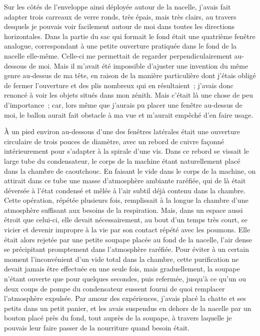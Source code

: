 \documentclass[french,twoside]{book} %
\begin{document}
Sur les côtés de l’enveloppe ainsi déployée autour de la nacelle, j’avais fait adapter trois carreaux de verre ronds, très épais, mais très clairs, au travers desquels je pouvais voir facilement autour de moi dans toutes les directions horizontales. Dans la partie du sac qui formait le fond était une quatrième fenêtre analogue, correspondant à une petite ouverture pratiquée dans le fond de la nacelle elle-même. Celle-ci me permettait de regarder perpendiculairement au-dessous de moi. Mais il m’avait été impossible d’ajuster une invention du même genre au-dessus de ma tête, en raison de la manière particulière dont j’étais obligé de fermer l’ouverture et des plis nombreux qui en résultaient ; j’avais donc renoncé à voir les objets situés dans mon zénith. Mais c’était là une chose de peu d’importance ; car, lors même que j’aurais pu placer une fenêtre au-dessus de moi, le ballon aurait fait obstacle à ma vue et m’aurait empêché d’en faire usage.\par
À un pied environ au-dessous d’une des fenêtres latérales était une ouverture circulaire de trois pouces de diamètre, avec un rebord de cuivre façonné intérieurement pour s’adapter à la spirale d’une vis. Dans ce rebord se vissait le large tube du condensateur, le corps de la machine étant naturellement placé dans la chambre de caoutchouc. En faisant le vide dans le corps de la machine, on attirait dans ce tube une masse d’atmosphère ambiante raréfiée, qui de là était déversée à l’état condensé et mêlée à l’air subtil déjà contenu dans la chambre. Cette opération, répétée plusieurs fois, remplissait à la longue la chambre d’une atmosphère suffisant aux besoins de la respiration. Mais, dans un espace aussi étroit que celui-ci, elle devait nécessairement, au bout d’un temps très court, se vicier et devenir impropre à la vie par son contact répété avec les poumons. Elle était alors rejetée par une petite soupape placée au fond de la nacelle, l’air dense se précipitant promptement dans l’atmosphère raréfiée. Pour éviter à un certain moment l’inconvénient d’un vide total dans la chambre, cette purification ne devait jamais être effectuée en une seule fois, mais graduellement, la soupape n’étant ouverte que pour quelques secondes, puis refermée, jusqu’à ce qu’un ou deux coups de pompe du condensateur eussent fourni de quoi remplacer l’atmosphère expulsée. Par amour des expériences, j’avais placé la chatte et ses petits dans un petit panier, et les avais suspendus en dehors de la nacelle par un bouton placé près du fond, tout auprès de la soupape, à travers laquelle je pouvais leur faire passer de la nourriture quand besoin était.\par
\end{document}
